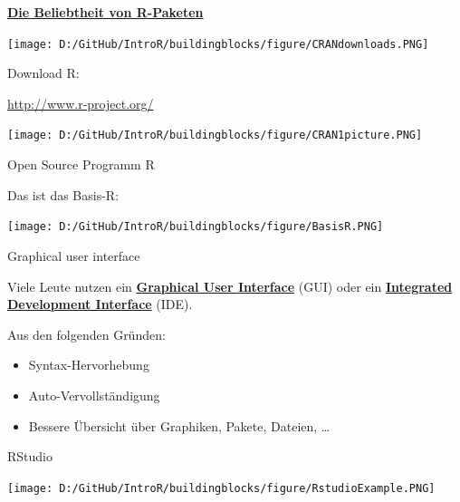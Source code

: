 \documentclass[ignorenonframetext,]{beamer}
\providecommand{\tightlist}{%
  \setlength{\itemsep}{0pt}\setlength{\parskip}{0pt}}
\begin{document}
\begin{frame}{\href{https://gallery.shinyapps.io/cran-gauge/}{\textbf{Die
Beliebtheit von R-Paketen}}}
\protect\hypertarget{die-beliebtheit-von-r-paketen}{}

\texttt{[image: D:/GitHub/IntroR/buildingblocks/figure/CRANdownloads.PNG]}

\end{frame}

\begin{frame}{Download R:}
\protect\hypertarget{download-r}{}

\url{http://www.r-project.org/}

\texttt{[image: D:/GitHub/IntroR/buildingblocks/figure/CRAN1picture.PNG]}

\end{frame}

\begin{frame}{Open Source Programm R}
\protect\hypertarget{open-source-programm-r}{}

\begin{block}{Das ist das Basis-R:}

\texttt{[image: D:/GitHub/IntroR/buildingblocks/figure/BasisR.PNG]}

\end{block}

\end{frame}

\begin{frame}{Graphical user interface}
\protect\hypertarget{graphical-user-interface}{}

Viele Leute nutzen ein
\href{https://en.wikipedia.org/wiki/Graphical_user_interface}{\textbf{Graphical
User Interface}} (GUI) oder ein
\href{https://en.wikipedia.org/wiki/Integrated_development_environment}{\textbf{Integrated
Development Interface}} (IDE).

Aus den folgenden Gründen:

\begin{itemize}
\tightlist
\item
  Syntax-Hervorhebung
\item
  Auto-Vervollständigung
\item
  Bessere Übersicht über Graphiken, Pakete, Dateien, \ldots{}
\end{itemize}

\end{frame}

\begin{frame}{RStudio}
\protect\hypertarget{rstudio}{}

\texttt{[image: D:/GitHub/IntroR/buildingblocks/figure/RstudioExample.PNG]}

\end{frame}
\end{document}
